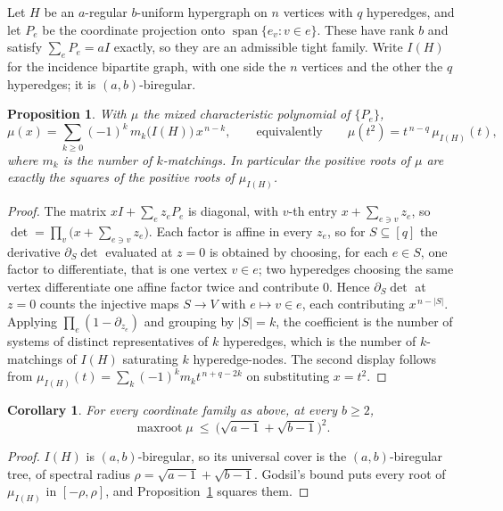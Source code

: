 \documentclass[11pt]{article}
\newtheorem{corollary}[theorem]{Corollary}
\newtheorem{proposition}[theorem]{Proposition}
\theoremstyle{remark}
\begin{document}
Let $H$ be an $a$-regular $b$-uniform hypergraph on $n$ vertices with $q$ hyperedges, and let
$P_e$ be the coordinate projection onto $\operatorname{span}\{e_v:v\in e\}$. These have rank $b$
and satisfy $\sum_eP_e=aI$ exactly, so they are an admissible tight family. Write $I(H)$ for the
incidence bipartite graph, with one side the $n$ vertices and the other the $q$ hyperedges; it is
$(a,b)$-biregular.

\begin{proposition}\label{prop:bridge}
With $\mu$ the mixed characteristic polynomial of $\{P_e\}$,
\[
\mu(x)=\sum_{k\ge0}(-1)^k\,m_k\bigl(I(H)\bigr)\,x^{\,n-k},
\qquad\text{equivalently}\qquad
\mu(t^2)=t^{\,n-q}\,\mu_{I(H)}(t),
\]
where $m_k$ is the number of $k$-matchings. In particular the positive roots of $\mu$ are exactly
the squares of the positive roots of $\mu_{I(H)}$.
\end{proposition}

\begin{proof}
The matrix $xI+\sum_ez_eP_e$ is diagonal, with $v$-th entry $x+\sum_{e\ni v}z_e$, so
$\det=\prod_v\bigl(x+\sum_{e\ni v}z_e\bigr)$. Each factor is affine in every $z_e$, so for
$S\subseteq[q]$ the derivative $\partial_S\det$ evaluated at $z=0$ is obtained by choosing, for
each $e\in S$, one factor to differentiate, that is one vertex $v\in e$; two hyperedges choosing
the same vertex differentiate one affine factor twice and contribute $0$. Hence $\partial_S\det$
at $z=0$ counts the injective maps $S\to V$ with $e\mapsto v\in e$, each contributing
$x^{\,n-|S|}$. Applying $\prod_e(1-\partial_{z_e})$ and grouping by $|S|=k$, the coefficient is
the number of systems of distinct representatives of $k$ hyperedges, which is the number of
$k$-matchings of $I(H)$ saturating $k$ hyperedge-nodes. The second display follows from
$\mu_{I(H)}(t)=\sum_k(-1)^km_kt^{\,n+q-2k}$ on substituting $x=t^2$.
\end{proof}

\begin{corollary}\label{cor:xucoord}
For every coordinate family as above, at every $b\ge2$,
\[
\operatorname{maxroot}\mu\ \le\ \bigl(\sqrt{a-1}+\sqrt{b-1}\bigr)^2 .
\]
\end{corollary}

\begin{proof}
$I(H)$ is $(a,b)$-biregular, so its universal cover is the $(a,b)$-biregular tree, of spectral
radius $\rho=\sqrt{a-1}+\sqrt{b-1}$. Godsil's bound \cite{Go} puts every root of $\mu_{I(H)}$ in
$[-\rho,\rho]$, and Proposition~\ref{prop:bridge} squares them.
\end{proof}
\end{document}
